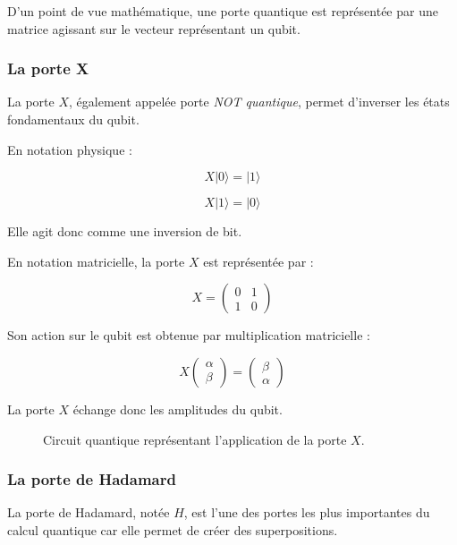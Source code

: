 \documentclass[a4paper,12pt]{article}
\begin{document}
D’un point de vue mathématique, une porte quantique est représentée par une matrice agissant sur le vecteur représentant un qubit.

\subsubsection{La porte X}

La porte $X$, également appelée porte \textit{NOT quantique}, permet d’inverser les états fondamentaux du qubit.

En notation physique :

\[
X|0\rangle = |1\rangle
\]

\[
X|1\rangle = |0\rangle
\]

Elle agit donc comme une inversion de bit.

En notation matricielle, la porte $X$ est représentée par :

\[
X
=
\begin{pmatrix}
0 & 1\\
1 & 0
\end{pmatrix}
\]

Son action sur le qubit est obtenue par multiplication matricielle :

\[
X
\begin{pmatrix}
\alpha \\
\beta
\end{pmatrix}
=
\begin{pmatrix}
\beta \\
\alpha
\end{pmatrix}
\]

La porte $X$ échange donc les amplitudes du qubit.

\begin{figure}[H]
\centering
{}
\caption{Circuit quantique représentant l’application de la porte $X$.}
\end{figure}

\subsubsection{La porte de Hadamard}

La porte de Hadamard, notée $H$, est l’une des portes les plus importantes du calcul quantique car elle permet de créer des superpositions.
\end{document}
